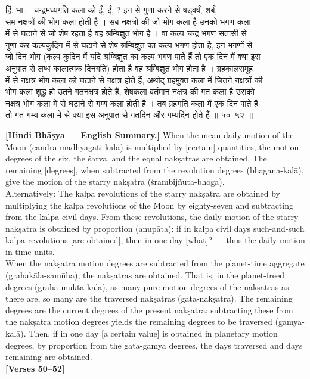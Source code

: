 \documentclass[11pt,a4paper]{article}
\newcommand{\dev}[1]{{\devanagarifont #1}}
\newcommand{\bilingualpair}[2]{%
  \noindent%
  \begin{minipage}[t]{0.48\textwidth}
    #1%
  \end{minipage}%
  \hfill%
  \begin{minipage}[t]{0.48\textwidth}
    #2%
  \end{minipage}%
  \par\vspace{0.5em}%
}
\newenvironment{sanskritcol}{\devanagarifont\small}{}
\newenvironment{englishcol}{\iastfont\small}{}
\begin{document}
\vspace{0.5cm}
\bilingualpair{%
\begin{sanskritcol}
\dev{हिं. भा.---चन्द्रमध्यगति कला को ईं, ईं, ? इन से गुणा करने से षड्वर्षं, शर्बं,}\\[0.3em]
\dev{सम नक्षत्रों की भोग कला होती है । सब नक्षत्रों की जो भोग कला है उनको भगण कला}\\[0.3em]
\dev{में से घटाने से जो शेष रहता है वह श्रम्बिज्ञुत भोग है । वा कल्प चन्द्र भगण सतासी से}\\[0.3em]
\dev{गुणा कर कल्पकुदिन में से घटाने से शेष श्रम्बिज्ञुत का कल्प भगण होता है, इन भगणों से}\\[0.3em]
\dev{जो दिन भोग (कल्प कुदिन में यदि श्रम्बिज्ञुत का कल्प भगण पाते हैं तो एक दिन में क्या इस}\\[0.3em]
\dev{अनुपात से लब्ध कालात्मक दिनगति) होता है वह श्रम्बिज्ञुत भोग होता है । ग्रहकालसमूह}\\[0.3em]
\dev{में से नक्षत्र भोग कला को घटाने से नक्षत्र होते हैं, अर्थाद् ग्रहमुक्त कला में जितने नक्षत्रों की}\\[0.3em]
\dev{भोग कला शुद्ध हो उतने गतनक्षत्र होते हैं, शेषकला वर्तमान नक्षत्र की गत कला है उसको}\\[0.3em]
\dev{नक्षत्र भोग कला में से घटाने से गम्य कला होती है । तब ग्रहगति कला में एक दिन पाते हैं}\\[0.3em]
\dev{तो गत-गम्य कला में से क्या इस अनुपात से गतदिन और गम्यदिन होते हैं ॥ ५०--५२ ॥}
\end{sanskritcol}%
}{%
\begin{englishcol}
\textbf{[Hindi Bhāṣya --- English Summary.]} When the mean daily motion of the Moon (candra-madhyagati-kalā) is multiplied by [certain] quantities, the motion degrees of the six, the śarva, and the equal nakṣatras are obtained. The remaining [degrees], when subtracted from the revolution degrees (bhagaṇa-kalā), give the motion of the starry nakṣatra (\'srambijñuta-bhoga).\\[0.3em]
Alternatively: The kalpa revolutions of the starry nakṣatra are obtained by multiplying the kalpa revolutions of the Moon by eighty-seven and subtracting from the kalpa civil days. From these revolutions, the daily motion of the starry nakṣatra is obtained by proportion (anupāta): if in kalpa civil days such-\-and-\-such kalpa revolutions [are obtained], then in one day [what]? --- thus the daily motion in time-\-units.\\[0.3em]
When the nakṣatra motion degrees are subtracted from the planet-\-time aggregate (grahakāla-samūha), the nakṣatras are obtained. That is, in the planet-\-freed degrees (graha-mukta-kalā), as many pure motion degrees of the nakṣatras as there are, so many are the traversed nakṣatras (gata-nakṣatra). The remaining degrees are the current degrees of the present nakṣatra; subtracting these from the nakṣatra motion degrees yields the remaining degrees to be traversed (gamya-kalā). Then, if in one day [a certain value] is obtained in planetary motion degrees, by proportion from the gata-gamya degrees, the days traversed and days remaining are obtained.\\[0.3em]
\hfill \textbf{[Verses 50--52]}
\end{englishcol}%
}
\end{document}

